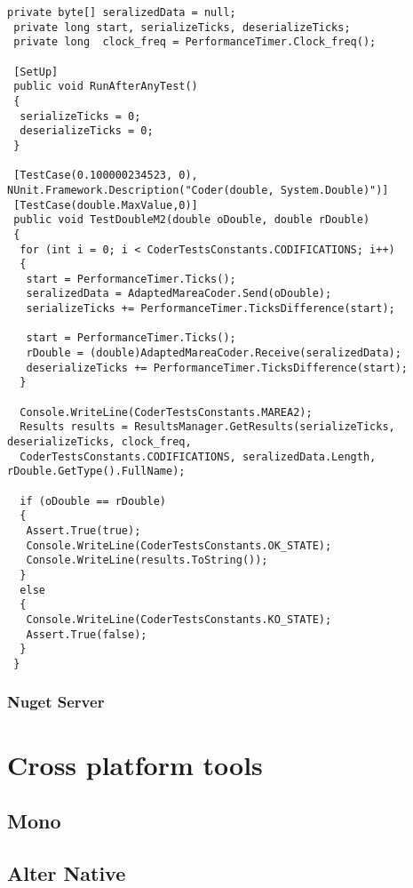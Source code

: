 \begin{lstlisting}[language=CSharp, caption={MAREA encoder layer unit test: serialization and deserialization of a double}, classoffset=2,morekeywords={SetUp,TestCase,PerformanceTimer,ResultsManager,Description,AdaptedMareaCoder,CoderTestsConstants,Results,Console,Assert},label={lst:NUnit-test}]
 private byte[] seralizedData = null;
 private long start, serializeTicks, deserializeTicks;
 private long  clock_freq = PerformanceTimer.Clock_freq();
  
 [SetUp]
 public void RunAfterAnyTest()
 {
  serializeTicks = 0;
  deserializeTicks = 0;
 }
  
 [TestCase(0.100000234523, 0), NUnit.Framework.Description("Coder(double, System.Double)")]
 [TestCase(double.MaxValue,0)]
 public void TestDoubleM2(double oDouble, double rDouble)
 {
  for (int i = 0; i < CoderTestsConstants.CODIFICATIONS; i++)
  {
   start = PerformanceTimer.Ticks();
   seralizedData = AdaptedMareaCoder.Send(oDouble);
   serializeTicks += PerformanceTimer.TicksDifference(start);

   start = PerformanceTimer.Ticks();
   rDouble = (double)AdaptedMareaCoder.Receive(seralizedData);
   deserializeTicks += PerformanceTimer.TicksDifference(start);
  } 

  Console.WriteLine(CoderTestsConstants.MAREA2);
  Results results = ResultsManager.GetResults(serializeTicks, deserializeTicks, clock_freq, 				
  CoderTestsConstants.CODIFICATIONS, seralizedData.Length, rDouble.GetType().FullName);
	
  if (oDouble == rDouble)
  {
   Assert.True(true);
   Console.WriteLine(CoderTestsConstants.OK_STATE);
   Console.WriteLine(results.ToString());
  }
  else
  {
   Console.WriteLine(CoderTestsConstants.KO_STATE);
   Assert.True(false);
  }
 }
\end{lstlisting}

\subsubsection{Nuget Server}\label{SSS:Tools-NuGet-server}

\section{Cross platform tools}\label{S:Tools-control}
\subsection{Mono}\label{SS:Tools-Mono}
\subsection{Alter Native}\label{SS:Tools-Alternative}








